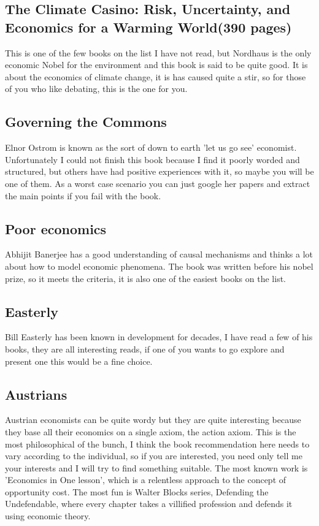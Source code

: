\documentclass[12pt]{report}
\numberwithin{equation}{section}
\begin{document}
\subsection*{The Climate Casino: Risk, Uncertainty, and Economics for a Warming World(390 pages)}

This is one of the few books on the list I have not read, but Nordhaus is the only economic Nobel for the environment and this book is said to be quite good. It is about the economics of climate change, it is has caused quite a stir, so for those of you who like debating, this is the one for you. 

\subsection*{Governing the Commons}

Elnor Ostrom is known as the sort of down to earth 'let us go see' economist. Unfortunately I could not finish this book because I find it poorly worded and structured, but others have had positive experiences with it, so maybe you will be one of them. As a worst case scenario you can just google her papers and extract the main points if you fail with the book. 

\subsection*{Poor economics}

Abhijit Banerjee has a good understanding of causal mechanisms and thinks a lot about how to model economic phenomena. The book was written before his nobel prize, so it meets the criteria, it is also one of the easiest books on the list. 

\subsection*{Easterly}

Bill Easterly has been known in development for decades, I have read a few of his books, they are all interesting reads, if one of you wants to go explore and present one this would be a fine choice. 

\subsection*{Austrians}

Austrian economists can be quite wordy but they are quite interesting because they base all their economics on a single axiom, the action axiom. This is the most philosophical of the bunch, I think the book recommendation here needs to vary according to the individual, so if you are interested, you need only tell me your interests and I will try to find something suitable. The most known work is 'Economics in One lesson', which is a relentless approach to the concept of opportunity cost. The most fun is Walter Blocks series, Defending the Undefendable, where every chapter takes a villified profession and defends it using economic theory. 
\end{document}
